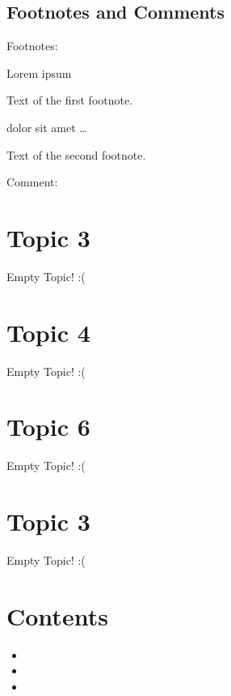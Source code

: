 \documentclass[letterpaper,10pt,english]{sphinxmanual}
\begin{document}
\section{Footnotes and Comments}
\label{\detokenize{textformating:footnotes-and-comments}}
Footnotes:

Lorem ipsum %
\begin{footnote}[1]\sphinxAtStartFootnote
Text of the first footnote.
%
\end{footnote} dolor sit amet … %
\begin{footnote}[2]\sphinxAtStartFootnote
Text of the second footnote.
%
\end{footnote}

Comment:


\chapter{Topic 3}
\label{\detokenize{topic3:topic-3}}\label{\detokenize{topic3::doc}}
Empty Topic! :(


\chapter{Topic 4}
\label{\detokenize{topic4::doc}}\label{\detokenize{topic4:topic-4}}
Empty Topic! :(


\chapter{Topic 6}
\label{\detokenize{topic5::doc}}\label{\detokenize{topic5:topic-6}}
Empty Topic! :(


\chapter{Topic 3}
\label{\detokenize{topic6:topic-3}}\label{\detokenize{topic6::doc}}
Empty Topic! :(


\chapter{Contents}
\label{\detokenize{index:contents}}\begin{itemize}
\item {} 

\item {} 

\item {} 

\end{itemize}



\renewcommand{\indexname}{Index}
\printindex
\end{document}
